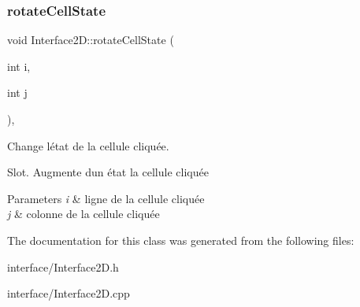 \subsubsection{\texorpdfstring{rotate\+Cell\+State}{rotateCellState}}
{\footnotesize\ttfamily void Interface2\+D\+::rotate\+Cell\+State (\begin{DoxyParamCaption}\item[{int}]{i,  }\item[{int}]{j }\end{DoxyParamCaption})\hspace{0.3cm}{\ttfamily [protected]}, {\ttfamily [slot]}}



Change l\textquotesingle{}état de la cellule cliquée. 

Slot. Augmente d\textquotesingle{}un état la cellule cliquée 
\begin{DoxyParams}{Parameters}
{\em i} & ligne de la cellule cliquée \\
\hline
{\em j} & colonne de la cellule cliquée \\
\hline
\end{DoxyParams}


The documentation for this class was generated from the following files\+:\begin{DoxyCompactItemize}
\item 
interface/Interface2\+D.\+h\item 
interface/Interface2\+D.\+cpp\end{DoxyCompactItemize}
